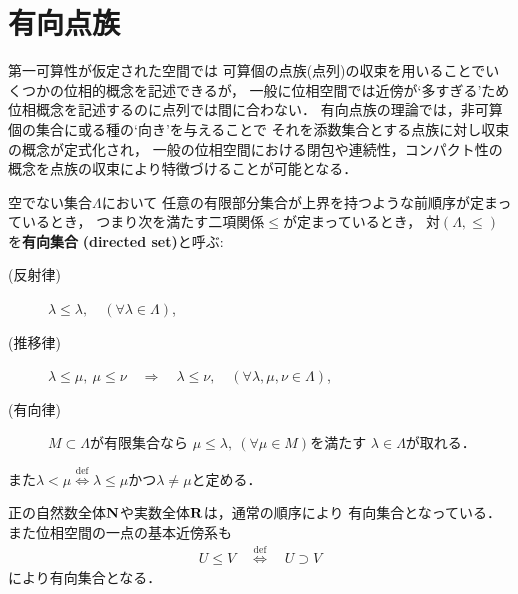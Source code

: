 \section{有向点族}
	第一可算性が仮定された空間では
	可算個の点族(点列)の収束を用いることでいくつかの位相的概念を記述できるが，
	一般に位相空間では近傍が`多すぎる'ため位相概念を記述するのに点列では間に合わない．
	有向点族の理論では，非可算個の集合に或る種の`向き'を与えることで
	それを添数集合とする点族に対し収束の概念が定式化され，
	一般の位相空間における閉包や連続性，コンパクト性の概念を点族の収束により特徴づけることが可能となる．
	
	\begin{screen}
		\begin{dfn}[有向集合]
			空でない集合$\Lambda$において
			任意の有限部分集合が上界を持つような前順序が定まっているとき，
			つまり次を満たす二項関係$\leq$が定まっているとき，
			対$(\Lambda,\leq)$を{\bf 有向集合}
			{\bf (directed set)}と呼ぶ:
			\begin{description}
				\item[(反射律)] $\lambda \leq \lambda,\quad (\forall \lambda \in \Lambda)$,
				\item[(推移律)] $\lambda \leq \mu,\ \mu \leq \nu 
					\quad \Longrightarrow \quad \lambda \leq \nu,\quad 
					(\forall \lambda,\mu,\nu \in \Lambda)$,
				\item[(有向律)] 
					$M \subset \Lambda$が有限集合なら
					$\mu \leq \lambda,\ (\forall \mu \in M)$を満たす
					$\lambda \in \Lambda$が取れる．
			\end{description}
			また$\lambda < \mu \overset{\mathrm{def}}{\Longleftrightarrow} 
			\mbox{$\lambda \leq \mu$かつ$\lambda \neq \mu$}$と定める．
		\end{dfn}
	\end{screen}
	正の自然数全体$\mathbf{N}$や実数全体$\mathbf{R}$は，通常の順序により
	有向集合となっている．また位相空間の一点の基本近傍系も
	\begin{align}
		U \leq V \quad \overset{\mathrm{def}}{\Longleftrightarrow} \quad
		U \supset V
	\end{align}
	により有向集合となる．
	
